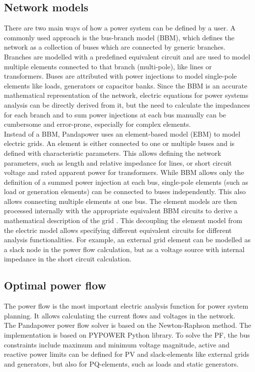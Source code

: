\subsection{Network models}
There are two main ways of how a power system can be defined by a user.
A commonly used approach is the bus-branch model (\gls{BBM}), which defines the network as a collection of buses which are connected by generic branches. Branches are modelled with a predefined equivalent circuit and are used to model multiple elements connected to that branch (multi-pole), like lines or transformers. Buses are attributed with power injections to model single-pole elements like loads, generators or capacitor banks. Since the \gls{BBM} is an accurate mathematical representation of the network, electric equations for power systems analysis can be directly derived from it, but the need to calculate the impedances for each branch and to sum power injections at each bus manually can be cumbersome and error-prone, especially for complex elements. \\
Instead of a \gls{BBM}, Pandapower uses an element-based model (\gls{EBM}) to model electric grids. An element is either connected to one or multiple buses and is defined with characteristic parameters. This allows defining the network parameters, such as length and relative impedance for lines, or short circuit voltage and rated apparent power for transformers. While \gls{BBM} allows only the definition of a summed power injection at each bus, single-pole elements (such as load or generation elements) can be connected to buses independently. This also allows connecting multiple elements at one bus. The element models are then processed internally with the appropriate equivalent \gls{BBM} circuits to derive a mathematical description of the grid \cite{pandapower}. This decoupling the element model from the electric model allows specifying different equivalent circuits for different analysis functionalities. For example, an external grid element can be modelled as a slack node in the power flow calculation, but as a voltage source with internal impedance in the short circuit calculation.

\subsection{Optimal power flow}
The power flow is the most important electric analysis function for power system planning. It allows calculating the current flows and voltages in the network. \\
The Pandapower power flow solver is based on the Newton-Raphson method. The implementation is based on PYPOWER Python library. To solve the \gls{PF}, the bus constraints include maximum and minimum voltage magnitude, active and reactive power limits can be defined for PV and slack-elements like external grids and generators, but also for PQ-elements, such as loads and static generators. \\

